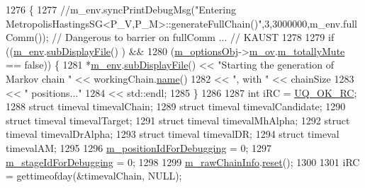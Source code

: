 \begin{DoxyCode}
1276 \{
1277   \textcolor{comment}{//m\_env.syncPrintDebugMsg("Entering
       MetropolisHastingsSG<P\_V,P\_M>::generateFullChain()",3,3000000,m\_env.fullComm()); // Dangerous to barrier on fullComm ... // KAUST}
1278 
1279   \textcolor{keywordflow}{if} ((\hyperlink{class_q_u_e_s_o_1_1_metropolis_hastings_s_g_ac8ea061e55b920e0c8f9bce5c3f20e52}{m\_env}.\hyperlink{class_q_u_e_s_o_1_1_base_environment_a8a0064746ae8dddfece4229b9ad374d6}{subDisplayFile}()                   ) &&
1280       (\hyperlink{class_q_u_e_s_o_1_1_metropolis_hastings_s_g_a5d0bc9f73d50d272aa6bfb5ef5939ef3}{m\_optionsObj}->\hyperlink{class_q_u_e_s_o_1_1_metropolis_hastings_s_g_options_a9d4792d9fc2dc5439b8ab489b0c236eb}{m\_ov}.\hyperlink{class_q_u_e_s_o_1_1_mh_options_values_af812309e81191e88dfdc87c5815141a3}{m\_totallyMute} == \textcolor{keyword}{false})) \{
1281     *\hyperlink{class_q_u_e_s_o_1_1_metropolis_hastings_s_g_ac8ea061e55b920e0c8f9bce5c3f20e52}{m\_env}.\hyperlink{class_q_u_e_s_o_1_1_base_environment_a8a0064746ae8dddfece4229b9ad374d6}{subDisplayFile}() << \textcolor{stringliteral}{"Starting the generation of Markov chain "} << 
      workingChain.\hyperlink{class_q_u_e_s_o_1_1_base_vector_sequence_a48f6fe02cf77f4233d3bcdfef3870f19}{name}()
1282                             << \textcolor{stringliteral}{", with "}                                  << chainSize
1283                             << \textcolor{stringliteral}{" positions..."}
1284                             << std::endl;
1285   \}
1286 
1287   \textcolor{keywordtype}{int} iRC = \hyperlink{namespace_q_u_e_s_o_a8e909502900aecf24cedba022ea84471}{UQ\_OK\_RC};
1288   \textcolor{keyword}{struct }timeval timevalChain;
1289   \textcolor{keyword}{struct }timeval timevalCandidate;
1290   \textcolor{keyword}{struct }timeval timevalTarget;
1291   \textcolor{keyword}{struct }timeval timevalMhAlpha;
1292   \textcolor{keyword}{struct }timeval timevalDrAlpha;
1293   \textcolor{keyword}{struct }timeval timevalDR;
1294   \textcolor{keyword}{struct }timeval timevalAM;
1295 
1296   \hyperlink{class_q_u_e_s_o_1_1_metropolis_hastings_s_g_a49500f5107190c94813e232cd806c2bc}{m\_positionIdForDebugging} = 0;
1297   \hyperlink{class_q_u_e_s_o_1_1_metropolis_hastings_s_g_aca9351ab468808759b8b19686231ae4f}{m\_stageIdForDebugging}    = 0;
1298 
1299   \hyperlink{class_q_u_e_s_o_1_1_metropolis_hastings_s_g_ac531509489028853bb17c0353fc9eafd}{m\_rawChainInfo}.\hyperlink{struct_q_u_e_s_o_1_1_m_h_raw_chain_info_struct_a366d78d7309ff99039bf005716ca18aa}{reset}();
1300 
1301   iRC = gettimeofday(&timevalChain, NULL);

\end{DoxyCode}
